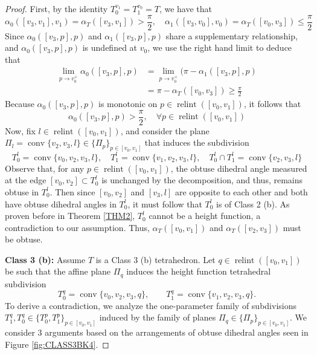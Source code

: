 \documentclass{mainresearch}
\begin{document}
\begin{proof}
	First, by the identity $T_0^{v_1}=T_1^{v_0}=T$, we have that
	\begin{equation*}
		\alpha_0([v_3,v_1],v_1) = \alpha_T([v_3,v_1])> \frac{\pi}{2}, \quad \alpha_1([v_3,v_0],v_0) = \alpha_T([v_0,v_3]) \le \frac{\pi}{2}
	\end{equation*}
	Since $\alpha_0([v_3,p],p)$ and $\alpha_1([v_3,p],p)$ share a supplementary relationship, and $\alpha_0([v_3,p],p)$ is undefined at $v_0$, we use the right hand limit to deduce that
	\begin{align*}
		\lim_{p \to v_0^+}\alpha_0([v_3,p],p)&= \lim_{p \to v_0^+}(\pi-\alpha_1([v_3,p],p) \\
		&= \pi - \alpha_T([v_0,v_3])\ge\frac{\pi}{2}
	\end{align*}
	Because $\alpha_0([v_3,p],p)$ is monotonic on $p \in \operatorname{relint}([v_0,v_1])$, it follows that
	\begin{equation*}
		\alpha_0([v_3,p],p) > \frac{\pi}{2}, \quad \forall p \in \operatorname{relint}([v_0,v_1])
	\end{equation*}
	Now, fix $l \in \operatorname{relint}([v_0,v_1])$, and consider the plane $\Pi_l = \operatorname{conv}\{v_2,v_3,l\} \in \{\Pi_p\}_{p \in[v_0,v_1]}$ that induces the subdivision
	\begin{equation*}
		T_0^l = \operatorname{conv}\{v_0,v_2,v_3,l\}, \quad T_1^l = \operatorname{conv}\{v_1,v_2,v_3,l\}, \quad T_0^l \cap T_1^l = \operatorname{conv}\{v_2,v_3,l\}
	\end{equation*}
	Observe that, for any $p \in \operatorname{relint}([v_0,v_1])$, the obtuse dihedral angle measured at the edge $[v_0,v_2] \subset T_0^l$ is unchanged by the decomposition, and thus, remains obtuse in $T_0^l$. Then since $[v_0,v_2]$ and $[v_3,l]$ are opposite to each other and both have obtuse dihedral angles in $T_0^l$, it must follow that $T_0^l$ is of Class 2 (b). As proven before in Theorem \ref{THM2}, $T_0^l$ cannot be a height function, a contradiction to our assumption. Thus, $\alpha_T([v_0,v_1])$ and $\alpha_T([v_2,v_3])$ must be obtuse.
	
	\bigskip
	
	\noindent\textbf{Class 3 (b):} Assume $T$ is a Class 3 (b) tetrahedron. Let $q\in\operatorname{relint}([v_0,v_1])$ be such that the affine plane $\Pi_q$ induces the height function tetrahedral subdivision
	\begin{equation*}
		T_0^q=\operatorname{conv}\{v_0,v_2,v_3,q\},\qquad
		T_1^q=\operatorname{conv}\{v_1,v_2,v_3,q\}.
	\end{equation*}
	To derive a contradiction, we analyze the one-parameter family of subdivisions $T_1^q,T_0^q \in \{T_0^p,T_1^p\}_{p \in [v_0,v_1]}$ induced by the family of planes $\Pi_q \in \{\Pi_{p}\}_{p \in [v_0,v_1]}$. We consider 3 arguments based on the arrangements of obtuse dihedral angles seen in Figure \ref{fig:CLASS3BK4}.
	

\end{proof}
\end{document}
